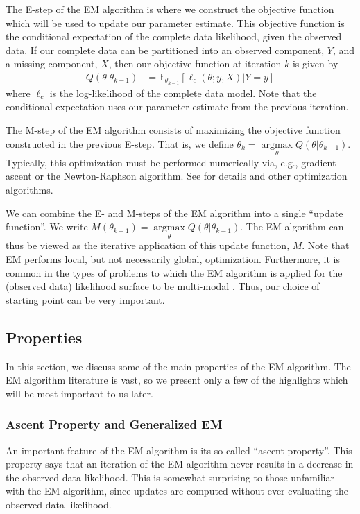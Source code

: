 \documentclass[11pt, oneside]{article}   	%
\newcommand{\bE}{\mathbb{E}}
\DeclareMathOperator*{\argmax}{argmax}
\begin{document}
The E-step of the EM algorithm is where we construct the objective function which will be used to update our parameter estimate. This objective function is the conditional expectation of the complete data likelihood, given the observed data. If our complete data can be partitioned into an observed component, $Y$, and a missing component, $X$, then our objective function at iteration $k$ is given by
%
\begin{align}
    Q(\theta|\theta_{k-1}) & = \bE_{\theta_{k-1}}[\ell_c(\theta; y, X) | Y=y]
\end{align}
%
where $\ell_c$ is the log-likelihood of the complete data model. Note that the conditional expectation uses our parameter estimate from the previous iteration.

The M-step of the EM algorithm consists of maximizing the objective function constructed in the previous E-step. That is, we define $\theta_k = \argmax\limits_\theta Q(\theta|\theta_{k-1})$. Typically, this optimization must be performed numerically via, e.g., gradient ascent or the Newton-Raphson algorithm. See \citet{Noc06} for details and other optimization algorithms. 

We can combine the E- and M-steps of the EM algorithm into a single ``update function''. We write $M(\theta_{k-1}) = \argmax\limits_\theta Q(\theta|\theta_{k-1})$. The EM algorithm can thus be viewed as the iterative application of this update function, $M$. Note that EM performs local, but not necessarily global, optimization. Furthermore, it is common in the types of problems to which the EM algorithm is applied for the (observed data) likelihood surface to be multi-modal \citep{McL08}. Thus, our choice of starting point can be very important.

\subsection{Properties}

In this section, we discuss some of the main properties of the EM algorithm. The EM algorithm literature is vast, so we present only a few of the highlights which will be most important to us later.

\subsubsection{Ascent Property and Generalized EM}
\label{sec2:GEM}

An important feature of the EM algorithm is its so-called ``ascent property''. This property says that an iteration of the EM algorithm never results in a decrease in the observed data likelihood. This is somewhat surprising to those unfamiliar with the EM algorithm, since updates are computed without ever evaluating the observed data likelihood. 
\end{document}
